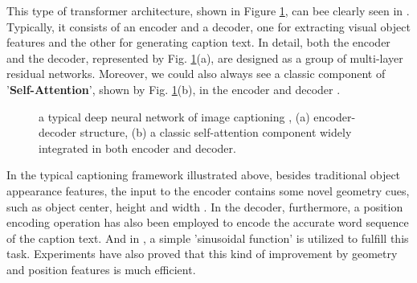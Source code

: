 \documentclass[review]{elsarticle}
\begin{document}
This type of transformer architecture, shown in Figure \ref{fig:transformer}, can bee clearly seen in \cite{guo2020normalized,herdade2019image,zhou2020unified,Chenhaishun2021}. Typically, it consists of an encoder and a decoder, one for extracting visual object features and the other for generating caption text. In detail, both the encoder and the decoder, represented by Fig. \ref{fig:transformer}(a), are designed as a group of multi-layer residual networks. Moreover, we could also always see a classic component of '\textbf{Self-Attention}', shown by Fig. \ref{fig:transformer}(b), in the encoder and decoder \cite{herdade2019image,li2019entangled}.


\begin{figure}[http]
  \small
  \centering
  \caption{a typical deep neural network of image captioning \cite{guo2020normalized}, (a) encoder-decoder structure, (b) a classic self-attention component widely integrated in both encoder and decoder.
  }

  \label{fig:transformer}
\end{figure}

In the typical captioning framework illustrated above, besides traditional object appearance features, the input to the encoder contains some novel geometry cues, such as object center, height and width \cite{guo2020normalized}. In the decoder, furthermore,  a position encoding operation has also been employed to encode the accurate word sequence of the caption text. And in \cite{guo2020normalized}, a simple 'sinusoidal function' is utilized to fulfill this task. Experiments have also proved that this kind of improvement by geometry and position features is much efficient.
\end{document}
